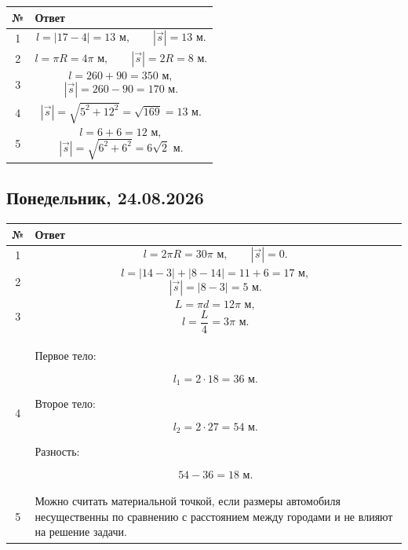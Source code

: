 \documentclass[a4paper,12pt]{article}
\begin{document}
\begin{center}
\renewcommand{\arraystretch}{1.35}

\begin{tabularx}{\linewidth}{@{}cX@{}}
\toprule
№ & Ответ\\
\midrule

1 &
\[
l=|17-4|=13\text{ м},
\qquad
|\vec{s}|=13\text{ м}.
\]
\\

2 &
\[
l=\pi R=4\pi\text{ м},
\qquad
|\vec{s}|=2R=8\text{ м}.
\]
\\

3 &
\[
l=260+90=350\text{ м},
\]
\[
|\vec{s}|=260-90=170\text{ м}.
\]
\\

4 &
\[
|\vec{s}|=
\sqrt{5^2+12^2}
=
\sqrt{169}
=
13\text{ м}.
\]
\\

5 &
\[
l=6+6=12\text{ м},
\]
\[
|\vec{s}|
=
\sqrt{6^2+6^2}
=
6\sqrt{2}\text{ м}.
\]
\\

\bottomrule
\end{tabularx}
\end{center}


\subsection*{\textcolor{darkaccent}{Понедельник, 24.08.2026}}

\begin{center}
\renewcommand{\arraystretch}{1.35}

\begin{tabularx}{\linewidth}{@{}cX@{}}
\toprule
№ & Ответ\\
\midrule

1 &
\[
l=2\pi R=30\pi\text{ м},
\qquad
|\vec{s}|=0.
\]
\\

2 &
\[
l=
|14-3|+|8-14|
=
11+6
=
17\text{ м},
\]
\[
|\vec{s}|=
|8-3|
=
5\text{ м}.
\]
\\

3 &
\[
L=\pi d=12\pi\text{ м},
\]
\[
l=\frac{L}{4}
=
3\pi\text{ м}.
\]
\\

4 &
Первое тело:

\[
l_1=2\cdot18=36\text{ м}.
\]

Второе тело:

\[
l_2=2\cdot27=54\text{ м}.
\]

Разность:

\[
54-36=18\text{ м}.
\]
\\

5 &
Можно считать материальной точкой,
если размеры автомобиля несущественны
по сравнению с расстоянием между городами
и не влияют на решение задачи.\\

\bottomrule
\end{tabularx}
\end{center}
\end{document}
